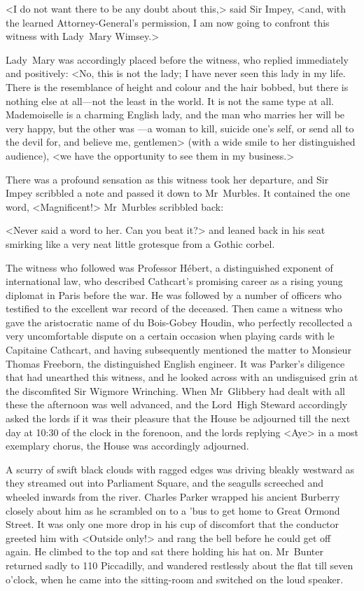 <I do not want there to be any doubt about this,> said Sir Impey, <and, with the learned Attorney-General's permission, I am now going to confront this witness with Lady~Mary Wimsey.>

Lady~Mary was accordingly placed before the witness, who replied immediately and positively: <No, this is not the lady; I have never seen this lady in my life. There is the resemblance of height and colour and the hair bobbed, but there is nothing else at all—not the least in the world. It is not the same type at all. Mademoiselle is a charming English lady, and the man who marries her will be very happy, but the other was —a woman to kill, suicide one's self, or send all to the devil for, and believe me, gentlemen> (with a wide smile to her distinguished audience), <we have the opportunity to see them in my business.>

There was a profound sensation as this witness took her departure, and Sir Impey scribbled a note and passed it down to Mr~Murbles. It contained the one word, <Magnificent!> Mr~Murbles scribbled back:

<Never said a word to her. Can you beat it?> and leaned back in his seat smirking like a very neat little grotesque from a Gothic corbel.

The witness who followed was Professor Hébert, a distinguished exponent of international law, who described Cathcart's promising career as a rising young diplomat in Paris before the war. He was followed by a number of officers who testified to the excellent war record of the deceased. Then came a witness who gave the aristocratic name of du Bois-Gobey Houdin, who perfectly recollected a very uncomfortable dispute on a certain occasion when playing cards with le Capitaine Cathcart, and having subsequently mentioned the matter to Monsieur Thomas Freeborn, the distinguished English engineer. It was Parker's diligence that had unearthed this witness, and he looked across with an undisguised grin at the discomfited Sir Wigmore Wrinching. When Mr~Glibbery had dealt with all these the afternoon was well advanced, and the Lord~High Steward accordingly asked the lords if it was their pleasure that the House be adjourned till the next day at 10:30 of the clock in the forenoon, and the lords replying <Aye> in a most exemplary chorus, the House was accordingly adjourned.

A scurry of swift black clouds with ragged edges was driving bleakly westward as they streamed out into Parliament Square, and the seagulls screeched and wheeled inwards from the river. Charles Parker wrapped his ancient Burberry closely about him as he scrambled on to a 'bus to get home to Great Ormond Street. It was only one more drop in his cup of discomfort that the conductor greeted him with <Outside only!> and rang the bell before he could get off again. He climbed to the top and sat there holding his hat on. Mr~Bunter returned sadly to 110 Piccadilly, and wandered restlessly about the flat till seven o'clock, when he came into the sitting-room and switched on the loud speaker.

